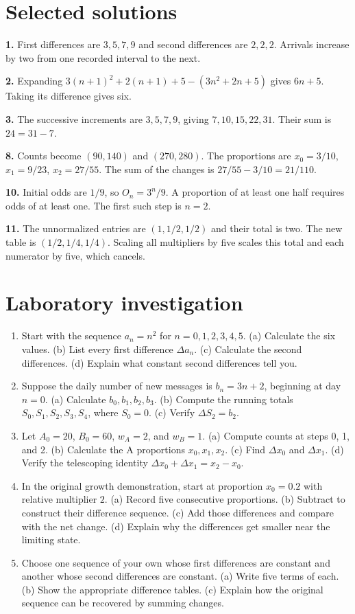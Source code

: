 \documentclass[11pt,oneside,openany]{book}
\theoremstyle{definition}
\theoremstyle{remark}
\numberwithin{equation}{chapter}
\providecommand{\tightlist}{\setlength{\itemsep}{0pt}\setlength{\parskip}{0pt}}
\newcommand{\labheading}{\FloatBarrier\section*{Laboratory investigation}\addcontentsline{toc}{section}{Laboratory investigation}}
\begin{document}
\section{Selected solutions}\label{ch01-selected-solutions}

\textbf{1.} First differences are \(3,5,7,9\) and second differences are \(2,2,2\). Arrivals increase by two from one recorded interval to the next.

\textbf{2.} Expanding \(3(n+1)^2+2(n+1)+5-(3n^2+2n+5)\) gives \(6n+5\). Taking its difference gives six.

\textbf{3.} The successive increments are \(3,5,7,9\), giving \(7,10,15,22,31\). Their sum is \(24=31-7\).

\textbf{8.} Counts become \((90,140)\) and \((270,280)\). The proportions are \(x_0=3/10\), \(x_1=9/23\), \(x_2=27/55\). The sum of the changes is \(27/55-3/10=21/110\).

\textbf{10.} Initial odds are \(1/9\), so \(O_n=3^n/9\). A proportion of at least one half requires odds of at least one. The first such step is \(n=2\).

\textbf{11.} The unnormalized entries are \((1,1/2,1/2)\) and their total is two. The new table is \((1/2,1/4,1/4)\). Scaling all multipliers by five scales this total and each numerator by five, which cancels.
\labheading\begin{enumerate}
\def\labelenumi{\arabic{enumi}.}
\tightlist
\item
  Start with the sequence \(a_n=n^2\) for \(n=0,1,2,3,4,5\). (a) Calculate the six values. (b) List every first difference \(\Delta a_n\). (c) Calculate the second differences. (d) Explain what constant second differences tell you.
\item
  Suppose the daily number of new messages is \(b_n=3n+2\), beginning at day \(n=0\). (a) Calculate \(b_0,b_1,b_2,b_3\). (b) Compute the running totals \(S_0,S_1,S_2,S_3,S_4\), where \(S_0=0\). (c) Verify \(\Delta S_2=b_2\).
\item
  Let \(A_0=20\), \(B_0=60\), \(w_A=2\), and \(w_B=1\). (a) Compute counts at steps 0, 1, and 2. (b) Calculate the A proportions \(x_0,x_1,x_2\). (c) Find \(\Delta x_0\) and \(\Delta x_1\). (d) Verify the telescoping identity \(\Delta x_0+\Delta x_1=x_2-x_0\).
\item
  In the original growth demonstration, start at proportion \(x_0=0.2\) with relative multiplier \(2\). (a) Record five consecutive proportions. (b) Subtract to construct their difference sequence. (c) Add those differences and compare with the net change. (d) Explain why the differences get smaller near the limiting state.
\item
  Choose one sequence of your own whose first differences are constant and another whose second differences are constant. (a) Write five terms of each. (b) Show the appropriate difference tables. (c) Explain how the original sequence can be recovered by summing changes.
\end{enumerate}

\FloatBarrier
\end{document}
